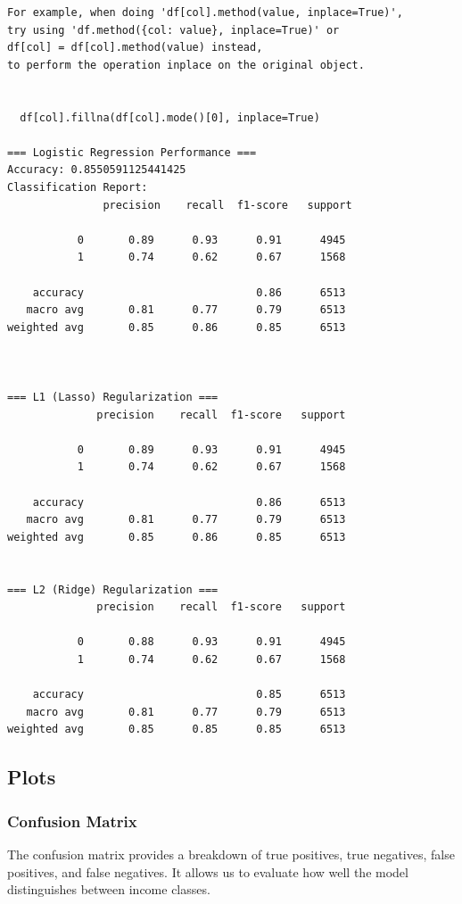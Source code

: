 \documentclass[a4paper,12pt]{article}
\begin{document}
\begin{verbatim}
For example, when doing 'df[col].method(value, inplace=True)', 
try using 'df.method({col: value}, inplace=True)' or 
df[col] = df[col].method(value) instead, 
to perform the operation inplace on the original object.


  df[col].fillna(df[col].mode()[0], inplace=True)

=== Logistic Regression Performance ===
Accuracy: 0.8550591125441425
Classification Report:
               precision    recall  f1-score   support

           0       0.89      0.93      0.91      4945
           1       0.74      0.62      0.67      1568

    accuracy                           0.86      6513
   macro avg       0.81      0.77      0.79      6513
weighted avg       0.85      0.86      0.85      6513



=== L1 (Lasso) Regularization ===
              precision    recall  f1-score   support

           0       0.89      0.93      0.91      4945
           1       0.74      0.62      0.67      1568

    accuracy                           0.86      6513
   macro avg       0.81      0.77      0.79      6513
weighted avg       0.85      0.86      0.85      6513


=== L2 (Ridge) Regularization ===
              precision    recall  f1-score   support

           0       0.88      0.93      0.91      4945
           1       0.74      0.62      0.67      1568

    accuracy                           0.85      6513
   macro avg       0.81      0.77      0.79      6513
weighted avg       0.85      0.85      0.85      6513
\end{verbatim}

\newpage
\subsection{Plots}

\subsubsection*{Confusion Matrix}

The confusion matrix provides a breakdown of true positives, true negatives, false positives, and false negatives. It allows us to evaluate how well the model distinguishes between income classes.
\end{document}
